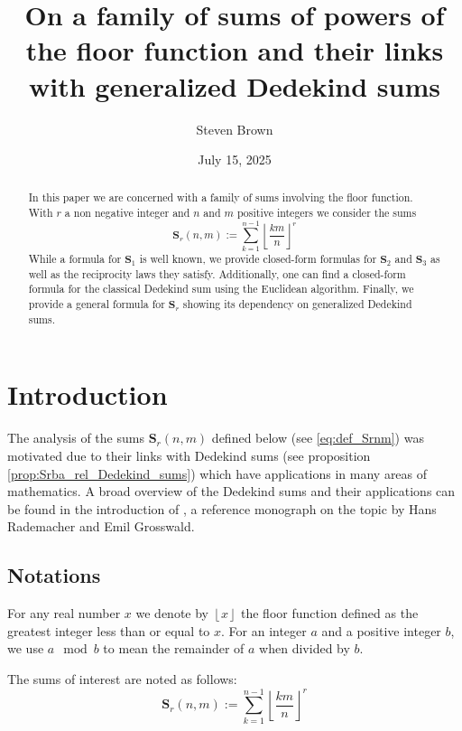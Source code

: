 \documentclass{article}%
\newcommand{\ENT}[1]{ \left\lfloor #1 \right\rfloor}
\newcommand{\Efrac}[2]{\ENT{\frac{#1}{#2}}}
\newcommand{\SUMS}[3]{\mathbf{S}_{#1}\left(#2,#3\right)}
\begin{document}
\title{On a family of sums of powers of the floor function and their links with generalized Dedekind sums}
\author{Steven Brown}
\date{July 15, 2025}
\maketitle

\begin{abstract}
In this paper we are concerned with a family of sums involving the floor function. With $r$ a non negative integer and $n$ and $m$ positive integers we consider the sums 
\begin{equation*}
\SUMS{r}{n}{m}:=\sum_{k=1}^{n-1}{\Efrac{km}{n}}^r
\end{equation*}
While a formula for $\mathbf{S}_1$ is well known, we  provide closed-form formulas for $\mathbf{S}_2$ and $\mathbf{S}_3$ as well as the reciprocity laws they satisfy. Additionally, one can find a closed-form formula for the classical Dedekind sum using the Euclidean algorithm. Finally, we provide a general formula for $\mathbf{S}_r$ showing its dependency on generalized Dedekind sums.
\end{abstract}

\section{Introduction}\label{sec:Introduction}

The analysis of the sums $\SUMS{r}{n}{m}$ defined below (see \ref{eq:def_Srnm}) was motivated due to their links with Dedekind sums (see proposition \ref{prop:Srba_rel_Dedekind_sums}) which have applications in many areas of mathematics. A broad overview of the Dedekind sums and their applications can be found in the introduction of \cite{rademacher1972dedekind}, a reference monograph on the topic by Hans Rademacher and Emil Grosswald.

\subsection{Notations} \label{sec:Notations}

For any real number $x$ we denote by $\ENT{x}$ the floor function defined as the greatest integer less than or equal to $x$. For an integer $a$ and a positive integer $b$, we use $a \mod b$ to mean the remainder of $a$ when divided by $b$.

The sums of interest are noted as follows:
\begin{equation} \label{eq:def_Srnm}
\SUMS{r}{n}{m}:=\sum_{k=1}^{n-1}{\Efrac{km}{n}}^r
\end{equation}
\end{document}
